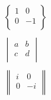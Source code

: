 \documentclass[12pt,a5paper]{book}
\begin{document}
\begin{align*}
\begin{Bmatrix}
1 & 0 \\
0 & -1\\
\end{Bmatrix}
\\~\\
\begin{vmatrix}
a & b \\
c & d\\
\end{vmatrix}
\\~\\
\begin{Vmatrix}
i & 0 \\
0 & -i\\
\end{Vmatrix}
\end{align*}
\end{document}
